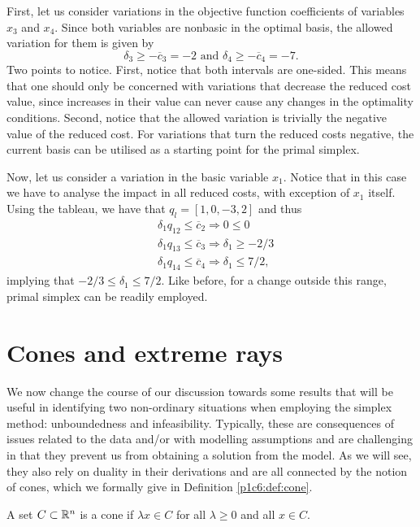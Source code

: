First, let us consider variations in the objective function coefficients of variables $x_3$ and $x_4$. Since both variables are nonbasic in the optimal basis, the allowed variation for them is given by
%
\begin{equation*}
	\delta_3 \geq -\overline{c}_3 = -2 \text{ and } 
    \delta_4 \geq -\overline{c}_4 = -7. 	
\end{equation*}
%
Two points to notice. First, notice that both intervals are one-sided. This means that one should only be concerned with variations that decrease the reduced cost value, since increases in their value can never cause any changes in the optimality conditions. Second, notice that the allowed variation is trivially the negative value of the reduced cost. For variations that turn the reduced costs negative, the current basis can be utilised as a starting point for the primal simplex.

Now, let us consider a variation in the basic variable $x_1$. Notice that in this case we have to analyse the impact in all reduced costs, with exception of $x_1$ itself. Using the tableau, we have that $q_l = [1, 0, -3, 2]$ and thus
%
\begin{align*}
	& \delta_1 q_{12} \leq \overline{c}_2 \Rightarrow 0 \leq 0 \\
	& \delta_1 q_{13} \leq \overline{c}_3 \Rightarrow \delta_1 \geq -2/3  \\
	& \delta_1 q_{14} \leq \overline{c}_4 \Rightarrow \delta_1 \leq 7/2, 
\end{align*}
%
implying that $-2/3 \leq \delta_1 \leq 7/2$. Like before, for a change outside this range, primal simplex can be readily employed.


\section{Cones and extreme rays}

We now change the course of our discussion towards some results that will be useful in identifying two non-ordinary situations when employing the simplex method: unboundedness and infeasibility. Typically, these are consequences of issues related to the data and/or with modelling assumptions and are challenging in that they prevent us from obtaining a solution from the model. As we will see, they also rely on duality in their derivations and are all connected by the notion of cones, which we formally give in Definition \ref{p1c6:def:cone}.

\begin{definition}[Cones]\label{p1c6:def:cone}
	A set $C \subset \mathbb{R}^n$ is a cone if $\lambda x \in C$ for all $\lambda \geq 0$ and all $x \in C$.	
\end{definition}

